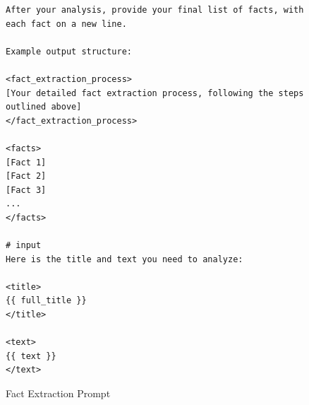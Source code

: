 \begin{figure}[htb]
\begin{lstlisting}
After your analysis, provide your final list of facts, with each fact on a new line.

Example output structure:

<fact_extraction_process>
[Your detailed fact extraction process, following the steps outlined above]
</fact_extraction_process>

<facts>
[Fact 1]
[Fact 2]
[Fact 3]
...
</facts>

# input
Here is the title and text you need to analyze:

<title>
{{ full_title }}
</title>

<text>
{{ text }}
</text>
\end{lstlisting}

\caption{Fact Extraction Prompt}
\label{lst:claim_extraction}
\end{figure}


